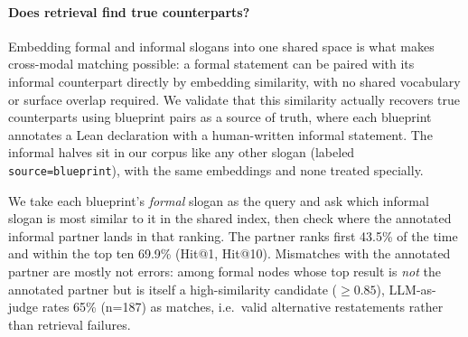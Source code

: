 \paragraph{Does retrieval find true counterparts?} Embedding formal and informal slogans into one shared space is what makes cross-modal matching possible: a formal statement can be paired with its informal counterpart directly by embedding similarity, with no shared vocabulary or surface overlap required. We validate that this similarity actually recovers true counterparts using blueprint pairs as a source of truth, where each blueprint annotates a Lean declaration with a human-written informal statement. The informal halves sit in our corpus like any other slogan (labeled \texttt{source=blueprint}), with the same embeddings and none treated specially.

We take each blueprint's \emph{formal} slogan as the query and ask which informal slogan is most similar to it in the shared index, then check where the annotated informal partner lands in that ranking. The partner ranks first 43.5\% of the time and within the top ten 69.9\% (Hit@1, Hit@10). Mismatches with the annotated partner are mostly not errors: among formal nodes whose top result is \emph{not} the annotated partner but is itself a high-similarity candidate ($\geq 0.85$), LLM-as-judge rates 65\% (n=187) as matches, i.e.\ valid alternative restatements rather than retrieval failures.

